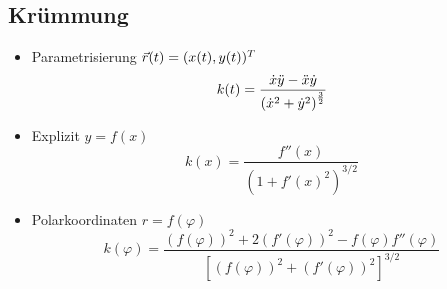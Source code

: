 \subsection{Krümmung}
    \begin{itemize}
        \item Parametrisierung $\vec{r}(t) = (x(t),y(t))^T$
            $$
                k(t) = \frac{\dot{x} \ddot{y} - \ddot{x} \dot{y}}{\left( \dot{x}^2 + \dot{y}^2 \right)^{\frac{3}{2}}}
            $$
        \item Explizit $y=f(x)$
            $$
                k(x) = \frac{f''(x)}{(1+f'(x)^2)^{3/2}}
            $$
        \item Polarkoordinaten $r=f(\varphi)$
            $$
                k(\varphi) = \frac{(f(\varphi))^2 + 2(f'(\varphi))^2-f(\varphi)f''(\varphi)}{\left[(f(\varphi))^2 + (f'(\varphi))^2\right]^{3/2}}
            $$
    \end{itemize}